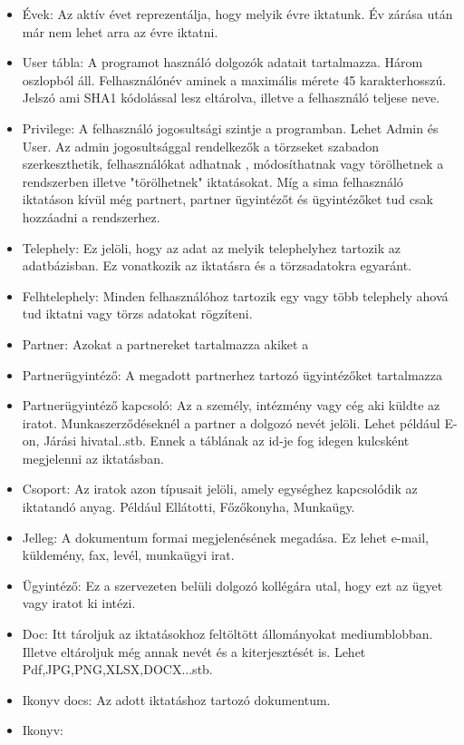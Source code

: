 \documentclass[conference]{IEEEtran}
\begin{document}
\begin{itemize}
	\item Évek:
	Az aktív évet reprezentálja, hogy melyik évre iktatunk. Év zárása után már nem lehet arra az évre iktatni.
	\item User tábla:
	A programot használó dolgozók adatait tartalmazza. Három oszlopból áll. Felhasználónév aminek a maximális mérete 45 karakterhosszú. Jelszó ami SHA1 kódolással lesz eltárolva, illetve a felhasználó teljese neve.
	\item Privilege:
	A felhasználó jogosultsági szintje a programban. Lehet Admin és User. Az admin jogosultsággal rendelkezők a törzseket szabadon szerkeszthetik, felhasználókat adhatnak , módosíthatnak vagy törölhetnek a rendszerben illetve "törölhetnek" iktatásokat.
	Míg a sima felhasználó iktatáson kívül még partnert, partner ügyintézőt és ügyintézőket tud csak hozzáadni a rendszerhez.
	\item Telephely:
	Ez jelöli, hogy az adat az melyik telephelyhez tartozik az adatbázisban. Ez vonatkozik az iktatásra és a törzsadatokra egyaránt.	
	\item Felhtelephely:	
	Minden felhasználóhoz tartozik egy vagy több telephely ahová tud iktatni vagy törzs adatokat rögzíteni. 
	\item Partner:	
	Azokat a partnereket tartalmazza akiket a
	\item Partnerügyintéző:
	A megadott partnerhez tartozó ügyintézőket tartalmazza
	\item Partnerügyintéző kapcsoló:
	Az a személy, intézmény vagy cég aki küldte az iratot. Munkaszerződéseknél a partner a dolgozó nevét jelöli. Lehet például E-on, Járási hivatal..stb. Ennek a táblának az id-je fog idegen kulcsként megjelenni az iktatásban.
	\item Csoport:
	Az iratok azon típusait jelöli, amely egységhez kapcsolódik az iktatandó anyag. Például Ellátotti, Főzőkonyha, Munkaügy.
	\item Jelleg:
	A dokumentum formai megjelenésének megadása. Ez lehet e-mail, küldemény, fax, levél, munkaügyi irat.
	\item Ügyintéző:	
	Ez a szervezeten belüli dolgozó kollégára utal, hogy ezt az ügyet vagy iratot ki intézi.
	\item Doc:
	Itt tároljuk az iktatásokhoz feltöltött állományokat mediumblobban. Illetve eltároljuk még annak nevét és a kiterjesztését is. Lehet Pdf,JPG,PNG,XLSX,DOCX...stb.
	\item Ikonyv docs:
	Az adott iktatáshoz tartozó dokumentum.
	\item Ikonyv:

\end{itemize}
\end{document}
